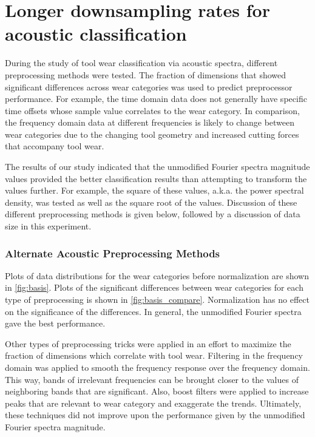 \chapter{Longer downsampling rates for acoustic classification
\label{chap:9}}

During the study of tool wear classification via acoustic spectra, 
different preprocessing methods were tested. 
The fraction of dimensions that showed significant differences 
across wear categories was used to predict preprocessor performance.
For example, the time domain data does not generally have specific 
time offsets whose sample value correlates to the wear category.
In comparison, the frequency domain data at different frequencies
is likely to change between wear categories due to the changing tool geometry
and increased cutting forces that accompany tool wear.

The results of our study indicated that the unmodified Fourier spectra magnitude values
provided the better classification results than attempting to transform the values further.
For example, the square of these values, a.k.a. the power spectral density, 
was tested as well as the square root of the values. Discussion of these different preprocessing
methods is given below, followed by a discussion of data size in this experiment.


\subsection{Alternate Acoustic Preprocessing Methods}


Plots of data distributions for the wear categories before normalization are shown in \ref{fig:basis}.
Plots of the significant differences between wear categories for each type of preprocessing 
is shown in \ref{fig:basis_compare}. Normalization has no effect on the significance of the differences.
In general, the unmodified Fourier spectra gave the best performance.

Other types of preprocessing tricks were applied in an effort 
to maximize the fraction of dimensions which correlate with tool wear.
Filtering in the frequency domain was applied to smooth 
the frequency response over the frequency domain.
This way, bands of irrelevant frequencies can be brought closer to the
values of neighboring bands that are significant. 
Also, boost filters were applied to increase peaks that are
relevant to wear category and exaggerate the trends.
Ultimately, these techniques did not improve upon the performance
given by the unmodified Fourier spectra magnitude.

